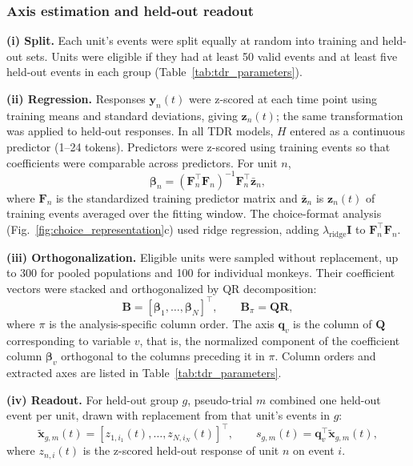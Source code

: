 \documentclass[pdflatex,sn-mathphys-num]{sn-jnl}%
\begin{document}
\subsubsection{Axis estimation and held-out readout}\label{sec:m_tdr}\label{sec:m_sampling}
\textbf{(i) Split.} Each unit's events were split equally at random into training and held-out sets. Units were eligible if they had at least 50 valid events and at least five held-out events in each group (Table~\ref{tab:tdr_parameters}).

\textbf{(ii) Regression.} Responses $\mathbf y_n(t)$ were z-scored at each time point using training means and standard deviations, giving $\mathbf z_n(t)$; the same transformation was applied to held-out responses. In all TDR models, $H$ entered as a continuous predictor (1--24 tokens). Predictors were z-scored using training events so that coefficients were comparable across predictors. For unit $n$,
\begin{equation}
\boldsymbol\beta_n=(\mathbf F_n^\top\mathbf F_n)^{-1}\mathbf F_n^\top\bar{\mathbf z}_n,
\end{equation}
where $\mathbf F_n$ is the standardized training predictor matrix and $\bar{\mathbf z}_n$ is $\mathbf z_n(t)$ of training events averaged over the fitting window. The choice-format analysis (Fig.~\ref{fig:choice_representation}c) used ridge regression, adding $\lambda_{\mathrm{ridge}}\mathbf I$ to $\mathbf F_n^\top\mathbf F_n$.

\textbf{(iii) Orthogonalization.} Eligible units were sampled without replacement, up to 300 for pooled populations and 100 for individual monkeys. Their coefficient vectors were stacked and orthogonalized by QR decomposition:
\begin{equation}
\mathbf B=[\boldsymbol\beta_1,\ldots,\boldsymbol\beta_N]^\top,
\qquad \mathbf B_\pi=\mathbf Q\mathbf R,
\end{equation}
where $\pi$ is the analysis-specific column order. The axis $\mathbf q_v$ is the column of $\mathbf Q$ corresponding to variable $v$, that is, the normalized component of the coefficient column $\boldsymbol\beta_v$ orthogonal to the columns preceding it in $\pi$. Column orders and extracted axes are listed in Table~\ref{tab:tdr_parameters}.

\textbf{(iv) Readout.} For held-out group $g$, pseudo-trial $m$ combined one held-out event per unit, drawn with replacement from that unit's events in $g$:
\begin{equation}
\widetilde{\mathbf x}_{g,m}(t)=[z_{1,i_1}(t),\ldots,z_{N,i_N}(t)]^\top,
\qquad s_{g,m}(t)=\mathbf q_v^\top\widetilde{\mathbf x}_{g,m}(t),
\end{equation}
where $z_{n,i}(t)$ is the z-scored held-out response of unit $n$ on event $i$.
\end{document}
